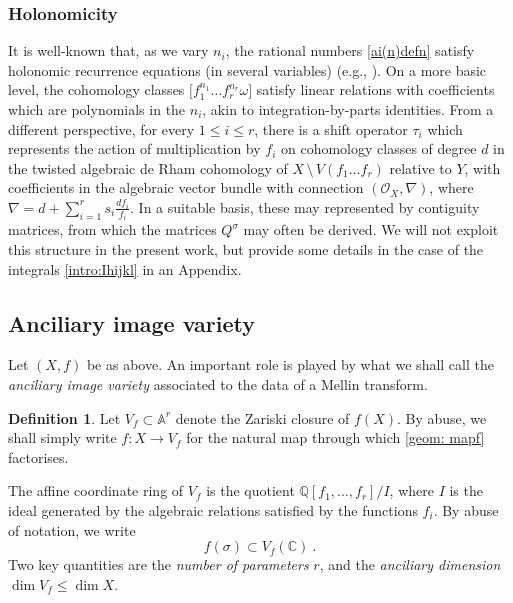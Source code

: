 \documentclass[a4paper,10pt]{amsart}
\theoremstyle{definition}
\newtheorem{defn}[thm]{Definition}
\theoremstyle{remark}
\numberwithin{equation}{section}
\newcommand{\Q}{\mathbb Q}
\newcommand{\C}{\mathbb C}
\newcommand{\0}{\color{blue}{\mathsf{0}}}
\begin{document}
\subsubsection{Holonomicity} It is well-known that, as we vary $n_i$, the rational numbers \eqref{ai(n)defn} satisfy holonomic recurrence equations (in several variables) (e.g., \cite{LoeserSabbah}). On a more basic level, the cohomology classes $ {[}f_1^{n_1} \ldots f_r^{n_r} \omega ] $  satisfy linear relations with coefficients which are polynomials in the $n_i$, akin to integration-by-parts identities.
From a different perspective, for every $1\leq i \leq r$, there  is a shift operator $\tau_i$ which represents the action of multiplication by $f_i$ on cohomology classes of degree $d$ in the twisted algebraic de Rham cohomology of 
$X\,  \setminus\, V(f_1\ldots f_r) $ relative to $Y$, with coefficients in the algebraic vector bundle with connection $(\mathcal{O}_X, \nabla)$, where $\nabla = d + \sum_{i=1}^r s_i \frac{d f_i}{f_i}$. In a suitable basis, these may represented by contiguity matrices, from which the matrices $Q^{\sigma}$ may often be derived. We will  not exploit this structure in the present work, but provide some details in the case of the integrals \eqref{intro:Ihijkl} in an Appendix. 


\subsection{Anciliary image variety}  Let $(X,f)$ be as above. An important role is played by what we shall call the  \emph{anciliary image variety} associated to the data of a Mellin transform.


\begin{defn} Let $V_f\subset \mathbb{A}^r$   denote the Zariski closure of $f(X)$. 
By abuse, we shall simply write $f: X \rightarrow V_f$ for the natural map through which \eqref{geom: mapf} factorises. 
\end{defn}

The affine coordinate ring of  $V_f$  is the quotient $\Q[f_1,\ldots, f_r]/I$,  where $I$ is the ideal generated by the algebraic relations satisfied by the functions $f_i$. By abuse of notation, we write  
\begin{equation} f(\sigma) \subset V_f(\C) \ .\end{equation}
Two key quantities are the \emph{number of parameters} $r$, and the \emph{anciliary  dimension}  $\dim V_f \leq \dim X$.
\end{document}
